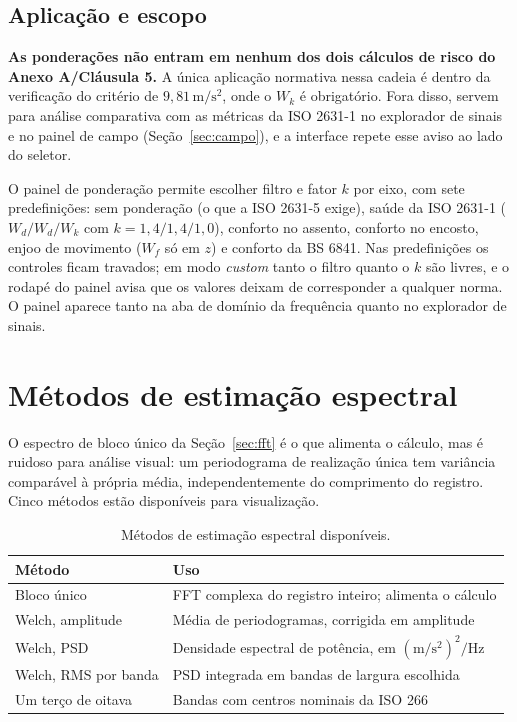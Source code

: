 \documentclass[11pt,a4paper]{article}
\newcommand{\unit}[2]{\ensuremath{#1\,\mathrm{#2}}}
\begin{document}
\subsection{Aplicação e escopo}

\textbf{As ponderações não entram em nenhum dos dois cálculos de risco do
Anexo A/Cláusula 5.} A única aplicação normativa nessa cadeia é dentro da
verificação do critério de \unit{9{,}81}{m/s^2}, onde o $W_k$ é obrigatório.
Fora disso, servem para análise comparativa com as métricas da ISO 2631-1 no
explorador de sinais e no painel de campo (Seção~\ref{sec:campo}), e a interface
repete esse aviso ao lado do seletor.

O painel de ponderação permite escolher filtro e fator $k$ por eixo, com sete
predefinições: sem ponderação (o que a ISO 2631-5 exige), saúde da ISO 2631-1
($W_d/W_d/W_k$ com $k = 1{,}4/1{,}4/1{,}0$), conforto no assento, conforto no
encosto, enjoo de movimento ($W_f$ só em $z$) e conforto da BS 6841. Nas
predefinições os controles ficam travados; em modo \emph{custom} tanto o filtro
quanto o $k$ são livres, e o rodapé do painel avisa que os valores deixam de
corresponder a qualquer norma. O painel aparece tanto na aba de domínio da
frequência quanto no explorador de sinais.

\section{Métodos de estimação espectral}
\label{sec:espectral}

O espectro de bloco único da Seção~\ref{sec:fft} é o que alimenta o cálculo,
mas é ruidoso para análise visual: um periodograma de realização única tem
variância comparável à própria média, independentemente do comprimento do
registro. Cinco métodos estão disponíveis para visualização.

\begin{table}[h]
\centering
\caption{Métodos de estimação espectral disponíveis.}
\begin{tabular}{ll}
\toprule
\textbf{Método} & \textbf{Uso} \\
\midrule
Bloco único & FFT complexa do registro inteiro; alimenta o cálculo \\
Welch, amplitude & Média de periodogramas, corrigida em amplitude \\
Welch, PSD & Densidade espectral de potência, em $(\mathrm{m/s^2})^2/\mathrm{Hz}$ \\
Welch, RMS por banda & PSD integrada em bandas de largura escolhida \\
Um terço de oitava & Bandas com centros nominais da ISO 266 \\
\bottomrule
\end{tabular}
\end{table}
\end{document}
